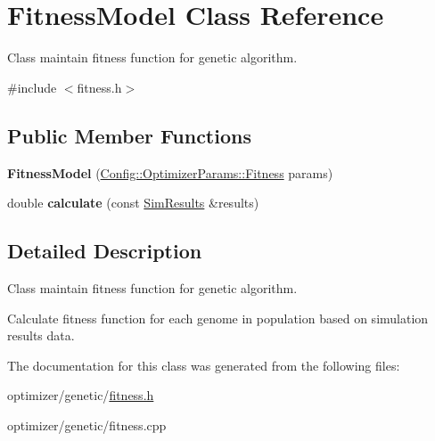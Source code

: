 \hypertarget{class_fitness_model}{}\section{Fitness\+Model Class Reference}
\label{class_fitness_model}


Class maintain fitness function for genetic algorithm.  




{\ttfamily \#include $<$fitness.\+h$>$}

\subsection*{Public Member Functions}
\begin{DoxyCompactItemize}
\item 
\mbox{\label{class_fitness_model_a3965cdc6d87b01d3ecef12c9f9653995}} 
{\bfseries Fitness\+Model} (\hyperlink{struct_config_1_1_optimizer_params_1_1_fitness}{Config\+::\+Optimizer\+Params\+::\+Fitness} params)
\item 
\mbox{\label{class_fitness_model_a12ea2da7e4b58bf907527b36a2086544}} 
double {\bfseries calculate} (const \hyperlink{class_sim_results}{Sim\+Results} \&results)
\end{DoxyCompactItemize}


\subsection{Detailed Description}
Class maintain fitness function for genetic algorithm. 

Calculate fitness function for each genome in population based on simulation results data. 

The documentation for this class was generated from the following files\+:\begin{DoxyCompactItemize}
\item 
optimizer/genetic/\hyperlink{fitness_8h}{fitness.\+h}\item 
optimizer/genetic/fitness.\+cpp\end{DoxyCompactItemize}
